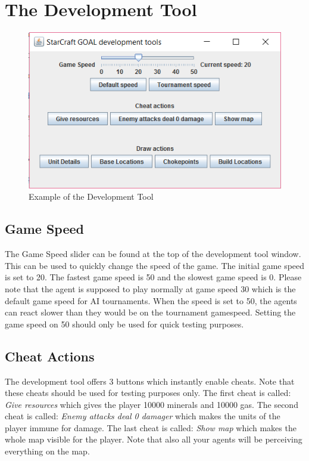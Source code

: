 \newpage
\section{The Development Tool}
\label{development tool}

\begin{figure}[h]
\includegraphics[width=1.0\textwidth]{images/developmentTool}
\caption{Example of the Development Tool}
\label{fig:starcraft_picture}
\end{figure}

\subsection{Game Speed}
The Game Speed slider can be found at the top of the development tool window. This can be used to quickly change the speed of the game. The initial game speed is set to 20. The fastest game speed is 50 and the slowest game speed is 0. Please note that the agent is supposed to play normally at game speed 30 which is the default game speed for AI tournaments. When the speed is set to 50, the agents can react slower than they would be on the tournament gamespeed. Setting the game speed on 50 should only be used for quick testing purposes.

\subsection{Cheat Actions}
The development tool offers 3 buttons which instantly enable cheats. Note that these cheats should be used for testing purposes only. The first cheat is called: \textit{Give resources} which gives the player 10000 minerals and 10000 gas. The second cheat is called: \textit{Enemy attacks deal 0 damager} which makes the units of the player immune for damage. The last cheat is called: \textit{Show map} which makes the whole map visible for the player. Note that also all your agents will be perceiving everything on the map. 

